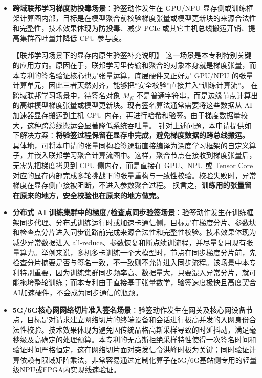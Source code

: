 \documentclass[12pt,a4paper]{article}
\begin{document}
\begin{itemize}
    \item \textbf{跨域联邦学习梯度防投毒场景}：验签动作发生在 GPU/NPU 显存侧或训练框架计算图内部，目标是在模型聚合前校验梯度张量或模型更新块的来源合法性和完整性，技术效果体现为防投毒、减少 PCIe 或其它主机总线搬运开销、提高集群吞吐量并降低 CPU 参与度。
    
    【联邦学习场景下的显存内原生验签补充说明】
    这一场景是本专利特别关键的应用方向。原因在于，联邦学习里传输和聚合的对象本身就是梯度张量，而本专利的签名验证核心也是张量运算，底层硬件又正好是 GPU/NPU 的张量计算单元，因此三者天然对齐，能够把“安全校验”直接并入“训练计算流”。
    在跨域联邦学习场景中，待签名对象 $M_{fl}$ 不是普通字符串，而是边缘节点计算出的高维模型梯度张量或模型更新块。现有签名算法通常需要将这些数据从 AI 加速器显存搬运到主机 CPU 内存，再进行哈希和验签。由于梯度数据量较大，这种跨总线搬运会显著降低系统吞吐量。
    针对上述问题，本申请提供如下解决方案：\textbf{将验签过程保留在显存中完成，避免梯度数据的跨总线搬运。}
    具体地，可将本申请的张量同构验签逻辑直接编译为深度学习框架的自定义算子，并嵌入联邦学习聚合计算流图中。这样，聚合节点在接收到梯度张量后，无需先把梯度拷贝到 CPU 侧内存，而是直接在 GPU、NPU 或 Tensor Core 对应的显存内部完成多轮挑战下的张量重构与一致性校验。校验失败时，异常梯度在显存侧直接被阻断，不进入参数聚合过程。
    换言之，\textbf{训练用的张量留在原来的地方，安全校验也在原来的地方做完。}

    \item \textbf{分布式 AI 训练集群中的梯度/检查点同步验签场景}：验签动作发生在训练框架同步代理、分布式训练运行时或加速卡通信侧，目标是在梯度分片、参数块和检查点分片进入同步链路前完成来源合法性和完整性校验。技术效果体现为减少异常数据进入 all-reduce、参数恢复和断点续训流程，并尽量复用现有张量算力。举例来说，多机多卡训练一个大模型时，节点在同步梯度分片前，先检查分片摘要是否与签名一致，不一致则不允许进入同步流程。该场景中本专利特别重要，因为训练集群同步频率高、数据量大，只要混入异常分片，就可能拖垮整轮训练；而本专利由于直接基于张量数学，验签速度极快且高度契合AI加速硬件，不会成为同步通信的瓶颈。

    \item \textbf{5G/6G核心网网络切片准入签名场景}：验签动作发生在网关及核心网设备节点，目标是对请求建立网络切片的终端设备和会话进行极高并发的入网身份合法性校验。技术效果体现为避免因传统晶格高斯采样导致的时延抖动，满足毫秒级及高确定的处理预算。本专利的无高斯拒绝采样特性使得一次签名时间和验证时间严格恒定，这在网络切片面对突发信令洪峰时极为关键；同时验证计算依赖有限域矩阵乘法，非常容易通过定制化算子在5G/6G基站侧专用的轻量级NPU或FPGA内实现线速验证。
\end{itemize}
\end{document}
